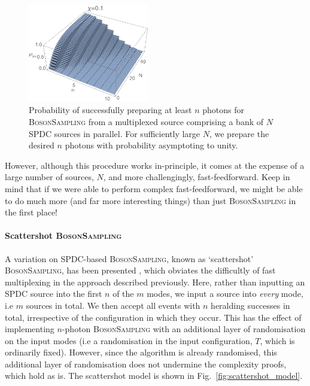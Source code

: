 \begin{figure}[htpb]
\includegraphics[width=0.47\textwidth]{multiplex_bs}
\caption{Probability of successfully preparing at least $n$ photons for \textsc{BosonSampling} from a multiplexed source comprising a bank of $N$ SPDC sources in parallel. For sufficiently large $N$, we prepare the desired $n$ photons with probability asymptoting to unity.} \label{fig:multiplex_bs_res}
\end{figure}

However, although this procedure works in-principle, it comes at the expense of a large number of sources, $N$, and more challengingly, fast-feedforward. Keep in mind that if we were able to perform complex fast-feedforward, we might be able to do much more (and far more interesting things) than just \textsc{BosonSampling} in the first place!

%
%

\paragraph{Scattershot \textsc{BosonSampling}} 

A variation on SPDC-based \textsc{BosonSampling}, known as `scattershot' \textsc{BosonSampling}, has been presented \cite{bib:RandBS}, which obviates the difficultly of fast multiplexing in the approach described previously. Here, rather than inputting an SPDC source into the first $n$ of the $m$ modes, we input a source into \textit{every} mode, i.e $m$ sources in total. We then accept all events with $n$ heralding successes in total, irrespective of the configuration in which they occur. This has the effect of implementing $n$-photon \textsc{BosonSampling} with an additional layer of randomisation on the input modes (i.e a randomisation in the input configuration, $T$, which is ordinarily fixed). However, since the algorithm is already randomised, this additional layer of randomisation does not undermine the complexity proofs, which hold as is. The scattershot model is shown in Fig.~\ref{fig:scattershot_model}.

